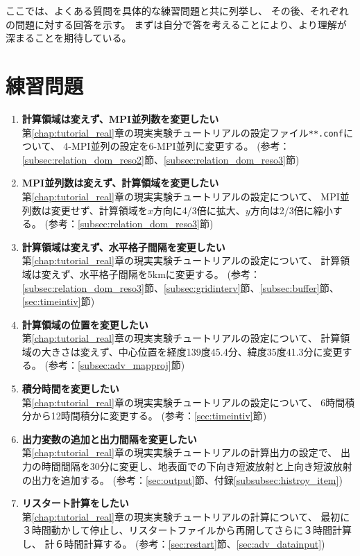 ここでは、よくある質問を具体的な練習問題と共に列挙し、
その後、それぞれの問題に対する回答を示す。
まずは自分で答を考えることにより、より理解が深まることを期待している。


\section*{練習問題}

\begin{enumerate}
\item {\bf 計算領域は変えず、MPI並列数を変更したい}\\
第\ref{chap:tutorial_real}章の現実実験チュートリアルの設定ファイル\verb|**.conf|について、
4-MPI並列の設定を6-MPI並列に変更する。
(参考：\ref{subsec:relation_dom_reso2}節、\ref{subsec:relation_dom_reso3}節)

\item {\bf MPI並列数は変えず、計算領域を変更したい}\\
第\ref{chap:tutorial_real}章の現実実験チュートリアルの設定について、
MPI並列数は変更せず、計算領域を$x$方向に4/3倍に拡大、$y$方向は2/3倍に縮小する。
(参考：\ref{subsec:relation_dom_reso3}節)

\item {\bf 計算領域は変えず、水平格子間隔を変更したい}\\
第\ref{chap:tutorial_real}章の現実実験チュートリアルの設定について、
計算領域は変えず、水平格子間隔を5kmに変更する。
(参考：\ref{subsec:relation_dom_reso3}節、\ref{subsec:gridinterv}節、\ref{subsec:buffer}節、\ref{sec:timeintiv}節)

\item {\bf 計算領域の位置を変更したい}\\
第\ref{chap:tutorial_real}章の現実実験チュートリアルの設定について、
計算領域の大きさは変えず、中心位置を経度139度45.4分、緯度35度41.3分に変更する。
(参考：\ref{subsec:adv_mapproj}節)

\item {\bf 積分時間を変更したい}\\
第\ref{chap:tutorial_real}章の現実実験チュートリアルの設定について、
6時間積分から12時間積分に変更する。
(参考：\ref{sec:timeintiv}節)

\item {\bf 出力変数の追加と出力間隔を変更したい}\\
第\ref{chap:tutorial_real}章の現実実験チュートリアルの計算出力の設定で、
出力の時間間隔を30分に変更し、地表面での下向き短波放射と上向き短波放射の出力を追加する。
(参考：\ref{sec:output}節、付録\ref{subsubsec:histroy_item})

\item {\bf リスタート計算をしたい}\\
第\ref{chap:tutorial_real}章の現実実験チュートリアルの計算について、
最初に３時間動かして停止し、リスタートファイルから再開してさらに３時間計算し、
計６時間計算する。
(参考：\ref{sec:restart}節、\ref{sec:adv_datainput})


\end{enumerate}

